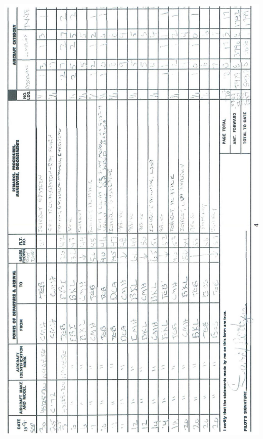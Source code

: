 \documentclass[10pt]{article}
\begin{document}
\includegraphics[max width=\textwidth, center]{2025_02_27_dd68c3d38de88f0516d9g-008}
\end{document}
